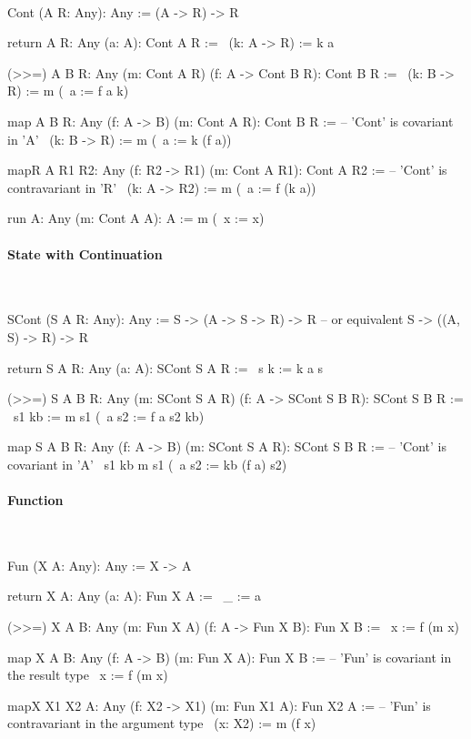 \ \begin{alba}
    Cont (A R: Any): Any :=
        (A -> R) -> R

    return {A R: Any} (a: A): Cont A R :=
        \ (k: A -> R) := k a

    (>>=) {A B R: Any} (m: Cont A R) (f: A -> Cont B R): Cont B R :=
        \ (k: B -> R) :=
            m (\ a := f a k)

    map {A B R: Any} (f: A -> B) (m: Cont A R): Cont B R :=
            -- 'Cont' is covariant in 'A'
        \ (k: B -> R) :=
            m (\ a := k (f a))

    mapR {A R1 R2: Any} (f: R2 -> R1) (m: Cont A R1): Cont A R2 :=
            -- 'Cont' is contravariant in 'R'
        \ (k: A -> R2) :=
            m (\ a :=  f (k a))


    run {A: Any} (m: Cont A A): A :=
        m (\ x := x)
\end{alba}




\paragraph{State with Continuation}

\ \begin{alba}
    SCont (S A R: Any): Any :=
        S -> (A -> S -> R) -> R
        -- or equivalent
        S -> ((A, S) -> R) -> R

    return {S A R: Any} (a: A): SCont S A R :=
        \ s k := k a s

    (>>=) {S A B R: Any} (m: SCont S A R) (f: A -> SCont S B R): SCont S B R :=
        \  s1 kb :=
            m s1 (\ a s2 := f a s2 kb)

    map {S A B R: Any} (f: A -> B) (m: SCont S A R): SCont S B R :=
            -- 'Cont' is covariant in 'A'
        \ s1 kb
            m s1 (\ a s2 := kb (f a) s2)
\end{alba}




\paragraph{Function}

\ \begin{alba}
    Fun (X A: Any): Any :=
        X -> A

    return {X A: Any} (a: A): Fun X A :=
        \ _ := a

    (>>=) {X A B: Any} (m: Fun X A) (f: A -> Fun X B): Fun X B :=
        \ x :=
            f (m x)

    map {X A B: Any} (f: A -> B) (m: Fun X A): Fun X B :=
            -- 'Fun' is covariant in the result type
        \ x := f (m x)

    mapX {X1 X2 A: Any} (f: X2 -> X1) (m: Fun X1 A): Fun X2 A :=
            -- 'Fun' is contravariant in the argument type
        \ (x: X2) :=
            m (f x)
\end{alba}
